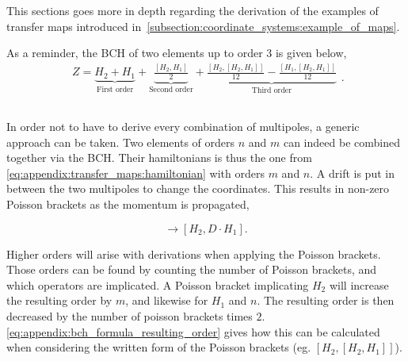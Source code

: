 \section{}

This sections goes more in depth regarding the derivation of the examples of transfer maps 
introduced in~\cref{subsection:coordinate_systems:example_of_maps}.

As a reminder, the BCH of two elements up to order 3 is given below,
\small
\begin{equation}
    \begin{aligned}
      Z = \underbrace{H_{2} + H_{1}}_{\text{First order}}
        + \underbrace{\frac{\left[H_{2},H_{1}\right]}{2}}_{\text{Second order}}
        + \underbrace{\frac{\left[H_{2},\left[H_{2},H_{1}\right]\right]}{12} - \frac{\left[H_{1},\left[H_{2},H_{1}\right]\right]}{12}}_{\text{Third order}}
    \end{aligned}.
\end{equation}
\normalsize


\subsection{}

In order not to have to derive every combination of multipoles, a generic approach can be taken.
Two elements of orders $n$ and $m$ can indeed be combined together via the BCH. Their hamiltonians
is thus the one from \cref{eq:appendix:transfer_maps:hamiltonian} with orders $m$ and $n$.
A drift is put in between the two multipoles to change the coordinates. This results in non-zero
Poisson brackets as the momentum is propagated,

\begin{equation}
  [H_2,H_1] \rightarrow [H_{2}, D \cdot H_{1}].
\end{equation}

Higher orders will arise with derivations when applying the Poisson brackets. Those orders can be 
found by counting the number of Poisson brackets, and which operators are implicated.
A Poisson bracket implicating $H_2$ will increase the resulting order by $m$, and likewise for $H_1$
and $n$. The resulting order is then decreased by the number of poisson brackets times $2$.
\cref{eq:appendix:bch_formula_resulting_order} gives how this can be calculated when considering
the written form of the Poisson brackets (eg. $[H_2, [H_2, H_1]]$).

